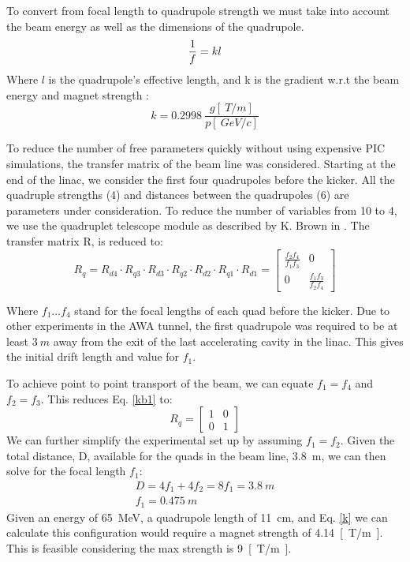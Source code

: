 To convert from focal length to quadrupole strength we must take into account the 
beam energy as well as the dimensions of the quadrupole. 
\begin{equation}
	\frac{1}{f} = kl \\
\end{equation}
Where $l$ is the quadrupole's effective length, and k is the gradient w.r.t 
the beam energy and magnet strength \cite{Wiedemann}:
\begin{equation}
	k = \SI{0.2998}{} \frac{g[\SI{}{T/m}]}{p [\SI{}{GeV/c}]}\label{k}
\end{equation}



 To reduce the number of free parameters quickly without using expensive PIC simulations, 
 the transfer matrix of the beam line was considered. Starting at the end of the linac, 
 we consider the first four quadrupoles before the kicker. All the quadruple strengths (4) and
 distances between the quadrupoles (6) are parameters under consideration. To reduce the number
 of variables from 10 to 4, we use the quadruplet telescope module as described by K. Brown in \cite{brown}.  The transfer matrix R, is reduced to:  
 \begin{equation}
 R_q = R_{d4} \cdot R_{q3} \cdot R_{d3} \cdot R_{q2} \cdot R_{d2} \cdot R_{q1} \cdot R_{d1} = 
 \begin{bmatrix}
 \frac{f_2 f_4}{f_1 f_3} & 0 \\
 0 & \frac{f_1 f_3}{f_2 f_4}	
 \end{bmatrix}\label{kb1}
 \end{equation}

Where $f_1 \ldots f_4$ stand for the focal lengths of each quad before the kicker. 
Due to other experiments in the AWA tunnel, 
the first quadrupole was required to be at least $\SI{3}{m}$ away from the exit of the 
last accelerating cavity in the linac. This gives the initial drift length and value
for $f_1$. 

To achieve point to point transport of the beam, we can 
equate $f_1 = f_4$ and $f_2 = f_3$. This reduces Eq. \ref{kb1} to:
 \begin{equation}
R_q =
\begin{bmatrix}
1 & 0 \\
0 & 1	
\end{bmatrix}
\end{equation}
We can further simplify the experimental set up by 
assuming $f_1=f_2$. Given the total distance, D, available for the
quads in the beam line, \SI{3.8}{m}, we can then solve
for the focal length $f_1$: 
\begin{align}
	D = 4f_1 + 4 f_2 = 8f_1 = \SI{3.8}{m} \\
	f_1 = \SI{0.475}{m}
\end{align}
Given an energy of \SI{65}{MeV}, a quadrupole length of \SI{11}{cm}, 
and Eq. \ref{k} we can calculate this configuration would require a 
magnet strength of \SI{4.14}{[T/m]}. This is feasible considering the 
max strength is \SI{9}{[T/m]}.

